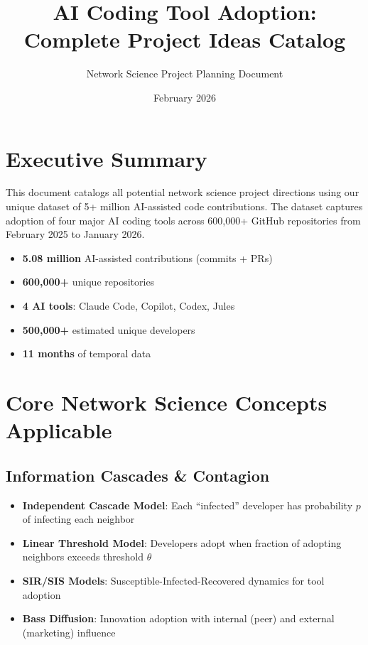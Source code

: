\documentclass[11pt,letterpaper]{article}
\title{\textbf{AI Coding Tool Adoption: Complete Project Ideas Catalog}}
\author{Network Science Project Planning Document}
\date{February 2026}
\begin{document}
\maketitle

\tableofcontents
\newpage

\section{Executive Summary}

This document catalogs all potential network science project directions using our unique dataset of 5+ million AI-assisted code contributions. The dataset captures adoption of four major AI coding tools across 600,000+ GitHub repositories from February 2025 to January 2026.

\begin{tcolorbox}[colback=accent!10,colframe=accent,title=Dataset at a Glance]
\begin{itemize}[noitemsep]
    \item \textbf{5.08 million} AI-assisted contributions (commits + PRs)
    \item \textbf{600,000+} unique repositories
    \item \textbf{4 AI tools}: Claude Code, Copilot, Codex, Jules
    \item \textbf{500,000+} estimated unique developers
    \item \textbf{11 months} of temporal data
\end{itemize}
\end{tcolorbox}

\section{Core Network Science Concepts Applicable}

\subsection{Information Cascades \& Contagion}

\begin{itemize}
    \item \textbf{Independent Cascade Model}: Each ``infected'' developer has probability $p$ of infecting each neighbor
    \item \textbf{Linear Threshold Model}: Developers adopt when fraction of adopting neighbors exceeds threshold $\theta$
    \item \textbf{SIR/SIS Models}: Susceptible-Infected-Recovered dynamics for tool adoption
    \item \textbf{Bass Diffusion}: Innovation adoption with internal (peer) and external (marketing) influence
\end{itemize}
\end{document}
